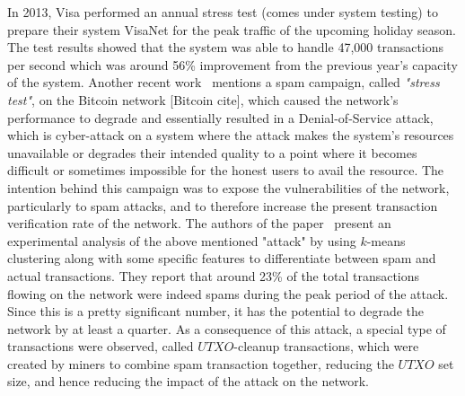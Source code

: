 In 2013, Visa performed an annual stress test (comes under system testing) to prepare their system VisaNet for the peak traffic of the upcoming holiday season. The test results showed that the system was able to handle 47,000 transactions per second which was around 56\% improvement from the previous year's capacity of the system. %
Another recent work~\cite{baqer2016stressing} mentions a spam campaign, called \textit{"stress test"}, on the Bitcoin network [Bitcoin cite], which caused the network's performance to degrade and essentially resulted in a Denial-of-Service attack, which is cyber-attack on a system where the attack makes the system's resources unavailable or degrades their intended quality to a point where it becomes difficult or sometimes impossible for the honest users to avail the resource. The intention behind this campaign was to expose the vulnerabilities of the network, particularly to spam attacks, and to therefore increase the present transaction verification rate of the network. The authors of the paper~\cite{baqer2016stressing} present an experimental analysis of the above mentioned "attack" by using $k$-means clustering along with some specific features to differentiate between spam and actual transactions. They report that around 23\% of the total transactions flowing on the network were indeed spams during the peak period of the attack. Since this is a pretty significant number, it has the potential to degrade the network by at least a quarter. As a consequence of this attack, a special type of transactions were observed, called $UTXO$-cleanup transactions, which were created by miners to combine spam transaction together, reducing the $UTXO$ set size, and hence reducing the impact of the attack on the network.

